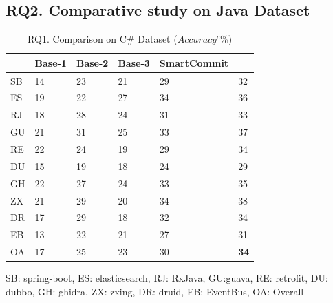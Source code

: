 \subsection{RQ2. Comparative study on Java Dataset}


\begin{table}[t]
	\caption{RQ1. Comparison on C\# Dataset ($Accuracy^c$\%)}
	\vspace{-0.1in}
	\begin{center}
		\footnotesize
		\tabcolsep 4pt
		\renewcommand{\arraystretch}{1} \begin{tabular}{p{0.5cm}<{\centering}|p{1.2cm}<{\centering}|p{1.2cm}<{\centering}|p{1.2cm}<{\centering}|p{1.2cm}<{\centering}|p{1.2cm}<{\centering}}
			
			\hline
			          & Base-1 & Base-2  & Base-3 & SmartCommit & \bf {\tool}\\
			\hline
			SB   & 14 & 23 & 21 & 29 & 32\\
			ES   & 19 & 22 & 27 & 34 & 36\\
			RJ   & 18 & 28 & 24 & 31 & 33\\
			GU   & 21 & 31 & 25 & 33 & 37\\
			RE   & 22 & 24 & 19 & 29 & 34\\
			DU   & 15 & 19 & 18 & 24 & 29\\
			GH   & 22 & 27 & 24 & 33 & 35\\
			ZX   & 21 & 29 & 20 & 34 & 38\\
			DR   & 17 & 29 & 18 & 32 & 34\\
			EB   & 13 & 22 & 21 & 27 & 31\\
			\hline
			OA   &  17  & 25 &  23 & 30 & {\bf 34} \\
			\hline
		\end{tabular}
		\label{RQ2-result-1}
	SB: spring-boot, ES: elasticsearch, RJ: RxJava, GU:guava, RE: retrofit, DU: dubbo, GH: ghidra, ZX: zxing, DR: druid, EB: EventBus, OA: Overall
	\end{center}
\end{table}


